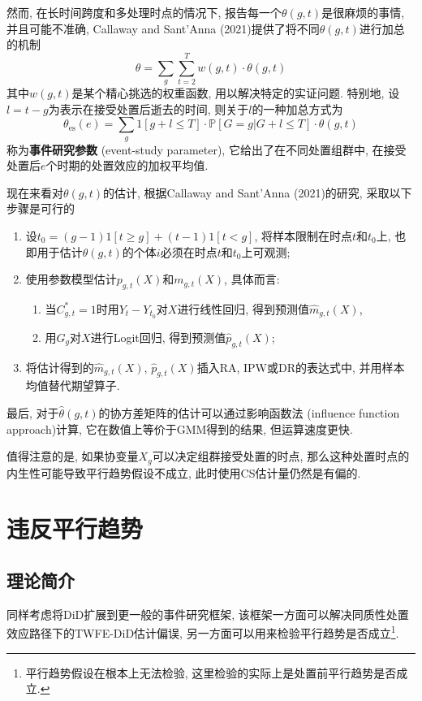 \documentclass[cn,sakura,14pt,screen,bibstyle=gb7714-2015,math=mtpro2]{elegantnote}
\begin{document}
然而, 在长时间跨度和多处理时点的情况下, 报告每一个$\theta(g,t)$是很麻烦的事情, 并且可能不准确, Callaway and Sant'Anna (2021)提供了将不同$\theta(g,t)$进行加总的机制
$$\theta=\sum_g\sum_{t=2}^Tw(g,t)\cdot\theta(g,t)$$
其中$w(g,t)$是某个精心挑选的权重函数, 用以解决特定的实证问题. 特别地, 设$l=t-g$为表示在接受处置后逝去的时间, 则关于$l$的一种加总方式为
$$\theta_{\text{es}}(e)=\sum_g1[g+l\leq T]\cdot\mathbb{P}[G=g|G+l\leq T]\cdot\theta(g,t)$$
称为\textbf{事件研究参数} (event-study parameter), 它给出了在不同处置组群中, 在接受处置后$e$个时期的处置效应的加权平均值.

现在来看对$\theta(g,t)$的估计, 根据Callaway and Sant'Anna (2021)的研究, 采取以下步骤是可行的
\begin{enumerate}[label=\arabic*.]
  \item 设$t_0=(g-1)1[t\ge g]+(t-1)1[t<g]$, 将样本限制在时点$t$和$t_0$上, 也即用于估计$\theta(g,t)$的个体$i$必须在时点$t$和$t_0$上可观测;
  \item 使用参数模型估计$p_{g,t}(X)$和$m_{g,t}(X)$, 具体而言:
  \begin{enumerate}[label=\alph*.]
    \item 当$C_{g,t}^\ast=1$时用$Y_{t}-Y_{t_0}$对$X$进行线性回归, 得到预测值$\hat{m}_{g,t}(X)$,
    \item 用$G_g$对$X$进行Logit回归, 得到预测值$\hat{p}_{g,t}(X)$;
  \end{enumerate}
  \item 将估计得到的$\hat{m}_{g,t}(X)$, $\hat{p}_{g,t}(X)$插入RA, IPW或DR的表达式中, 并用样本均值替代期望算子.
\end{enumerate}
最后, 对于$\hat{\theta}(g,t)$的协方差矩阵的估计可以通过影响函数法 (influence function approach)计算, 它在数值上等价于GMM得到的结果, 但运算速度更快.

值得注意的是, 如果协变量$X_g$可以决定组群接受处置的时点, 那么这种处置时点的内生性可能导致平行趋势假设不成立, 此时使用CS估计量仍然是有偏的.

\newpage
\section{违反平行趋势}
\subsection{理论简介}
同样考虑将DiD扩展到更一般的事件研究框架, 该框架一方面可以解决同质性处置效应路径下的TWFE-DiD估计偏误, 另一方面可以用来检验平行趋势是否成立\footnote{平行趋势假设在根本上无法检验, 这里检验的实际上是处置前平行趋势是否成立.}.
\end{document}
